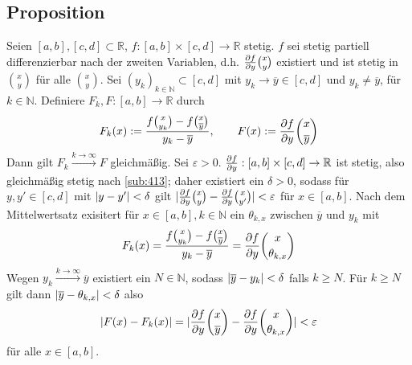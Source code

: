 \subsection[Proposition: Differentialquotient und partielle Ableitung]{Proposition} %
\label{sub:93}
Seien $[a,b], [c,d] \subset \mathds{R}$, $f : [a,b] \times [c,d] \to \mathds{R}$ stetig. $f$ sei stetig partiell differenzierbar nach der zweiten Variablen, d.h.
$\frac{{\partial f}}{{\partial y}}  \binom{x}{y} $ existiert und ist stetig in $\binom{x}{y}$ für alle $\binom{x}{y} $. Sei $(y_k)_{k \in \mathds{N}} \subset [c,d]$ mit $y_k \to \overline{y} \in [c,d]$ und 
$y_k  \not= \overline{y}$, für $k \in \mathds{N} $. Definiere $F_k, F : [a,b] \to \mathds{R}$ durch 
\[
	F_k(x) := \frac{f \binom{x}{y_k} - f \binom{x}{\overline{y} }  }{y_k -\overline{y} }, \qquad F(x) := \frac{{\partial f}}{{\partial y}}  \binom{x}{\overline{y} }   
\]
Dann gilt $F_k \xrightarrow{k \to \infty}  F$ gleichmäßig.
Sei $\varepsilon >0$. $\frac{{\partial f}}{{\partial y}}  : [a,b] \times [c,d] \to \mathbb{R}$ ist stetig, also gleichmäßig stetig nach \ref{sub:413}; daher existiert ein $\delta  >0$, sodass
für $y,y' \in [c,d]$ mit $\lvert y-y'\rvert< \delta$ gilt $\lvert\frac{{\partial f}}{{\partial y}}  \binom{x}{y} - \frac{{\partial f}}{{\partial y}}  \binom{x}{y'}\rvert < \varepsilon $ für $x \in [a,b]$. Nach dem Mittelwertsatz
exisitert für $x \in [a,b], k \in \mathds{N}$ ein $\theta_{k,x}$ zwischen $\overline{y}$ und $y_k$ mit 
\begin{align*}
	F_k(x) = \frac{f \binom{x}{y_k} - f \binom{x}{\overline{y} }  }{y_k - \overline{y} } = \frac{{\partial f}}{{\partial y}}  \binom{x}{\theta_{k,x}} 
\end{align*}
Wegen $y_k \xrightarrow{k \to \infty} \overline{y} $ existiert ein $N \in \mathds{N}$, sodass $\lvert\overline{y} - y_k \rvert < \delta  $ falls $k \ge N$. Für $k \ge N$ gilt
dann $\lvert\overline{y} - \theta_{k,x} \rvert < \delta  $ also 
\begin{align*}
	\lvert F(x) - F_k (x)\rvert = \lvert \frac{{\partial f}}{{\partial y}}   \binom{x}{\overline{y} } - \frac{{\partial f}}{{\partial y}}  \binom{x}{\theta_{k,x}}  \rvert  < \varepsilon
\end{align*}
für alle $x \in [a,b]$. \bewende

